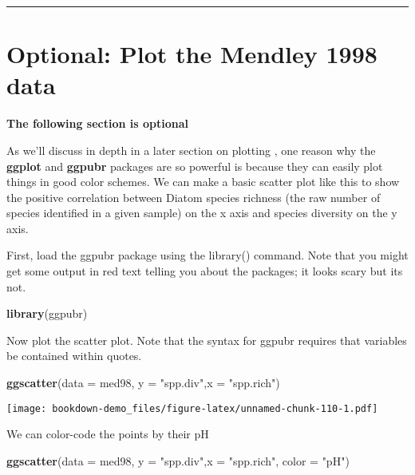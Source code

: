 \documentclass[]{book}
\newenvironment{Shaded}{\begin{snugshade}}{\end{snugshade}}
\newcommand{\KeywordTok}[1]{\textcolor[rgb]{0.13,0.29,0.53}{\textbf{#1}}}
\newcommand{\DataTypeTok}[1]{\textcolor[rgb]{0.13,0.29,0.53}{#1}}
\newcommand{\StringTok}[1]{\textcolor[rgb]{0.31,0.60,0.02}{#1}}
\newcommand{\NormalTok}[1]{#1}
\theoremstyle{definition}
\theoremstyle{definition}
\theoremstyle{definition}
\theoremstyle{remark}
\begin{document}
\begin{center}\rule{0.5\linewidth}{\linethickness}\end{center}

\section{Optional: Plot the Mendley 1998
data}\label{optional-plot-the-mendley-1998-data}

\textbf{The following section is optional}

As we'll discuss in depth in a later section on plotting , one reason
why the \textbf{ggplot} and \textbf{ggpubr} packages are so powerful is
because they can easily plot things in good color schemes. We can make a
basic scatter plot like this to show the positive correlation between
Diatom species richness (the raw number of species identified in a given
sample) on the x axis and species diversity on the y axis.

First, load the ggpubr package using the library() command. Note that
you might get some output in red text telling you about the packages; it
looks scary but its not.

\begin{Shaded}
\begin{Highlighting}[]
\KeywordTok{library}\NormalTok{(ggpubr)}
\end{Highlighting}
\end{Shaded}

Now plot the scatter plot. Note that the syntax for ggpubr requires that
variables be contained within quotes.

\begin{Shaded}
\begin{Highlighting}[]
\KeywordTok{ggscatter}\NormalTok{(}\DataTypeTok{data =}\NormalTok{ med98, }\DataTypeTok{y =} \StringTok{"spp.div"}\NormalTok{,}\DataTypeTok{x =} \StringTok{"spp.rich"}\NormalTok{)}
\end{Highlighting}
\end{Shaded}

\texttt{[image: bookdown-demo\_files/figure-latex/unnamed-chunk-110-1.pdf]}

We can color-code the points by their pH

\begin{Shaded}
\begin{Highlighting}[]
\KeywordTok{ggscatter}\NormalTok{(}\DataTypeTok{data =}\NormalTok{ med98, }\DataTypeTok{y =} \StringTok{"spp.div"}\NormalTok{,}\DataTypeTok{x =} \StringTok{"spp.rich"}\NormalTok{, }\DataTypeTok{color =} \StringTok{"pH"}\NormalTok{)}
\end{Highlighting}
\end{Shaded}
\end{document}
